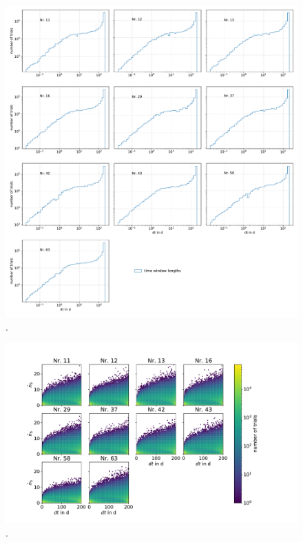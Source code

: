 \begin{figure}
    \centering
    \includegraphics[width=\linewidth]{Plots/05_csky/9_years_gfu_gold_time_dep_bg_dt.pdf}
    \caption{.}
    \label{fig:bg_trials_time_dep_time_windows}
\end{figure}

\begin{figure}
    \centering
    \includegraphics[width=\linewidth]{Plots/05_csky/time_window_ns_bg_time_dep.pdf}
    \caption{.}
    \label{fig:bg_trials_time_dep_time_windows_ns}
\end{figure}


